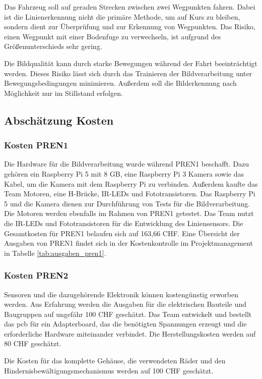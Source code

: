 \documentclass[../main.tex]{subfiles}
\begin{document}
Das Fahrzeug soll auf geraden Strecken zwischen zwei Wegpunkten fahren. Dabei ist die Linienerkennung nicht die primäre Methode, um auf Kurs zu bleiben, sondern dient zur Überprüfung und zur Erkennung von Wegpunkten. Das Risiko, einen Wegpunkt mit einer Bodenfuge zu verwechseln, ist aufgrund des Größenunterschieds sehr gering.

Die Bildqualität kann durch starke Bewegungen während der Fahrt beeinträchtigt werden. Dieses Risiko lässt sich durch das Trainieren der Bildverarbeitung unter Bewegungsbedingungen minimieren. Außerdem soll die Bilderkennung nach Möglichkeit nur im Stillstand erfolgen.

\subsection{Abschätzung Kosten}

\subsubsection{Kosten PREN1}
Die Hardware für die Bildverarbeitung wurde während PREN1 beschafft. Dazu gehören ein Raspberry Pi 5 mit 8 GB, eine Raspberry Pi 3 Kamera sowie das Kabel, um die Kamera mit dem Raspberry Pi zu verbinden. Außerdem kaufte das Team Motoren, eine H-Brücke, IR-LEDs und Fototransistoren. Das Raspberry Pi 5 und die Kamera dienen zur Durchführung von Tests für die Bildverarbeitung. Die Motoren werden ebenfalls im Rahmen von PREN1 getestet. Das Team nutzt die IR-LEDs und Fototransistoren für die Entwicklung des Liniensensors. Die Gesamtkosten für PREN1 belaufen sich auf 163,66 CHF. Eine Übersicht der Ausgaben von PREN1 findet sich in der Kostenkontrolle im Projektmanagement in Tabelle \ref{tab:ausgaben_pren1}.

\subsubsection{Kosten PREN2}
Sensoren und die dazugehörende Elektronik können kostengünstig erworben werden. Aus Erfahrung werden die Ausgaben für die elektrischen Bauteile und Baugruppen auf ungefähr 100 CHF geschätzt. Das Team entwickelt und bestellt das \acrshort{pcb} für ein Adapterboard, das die benötigten Spannungen erzeugt und die erforderliche Hardware miteinander verbindet. Die Herstellungskosten werden auf 80 CHF geschätzt.

Die Kosten für das komplette Gehäuse, die verwendeten Räder und den Hindernisbewältigungsmechanismus werden auf 100 CHF geschätzt.
\end{document}
